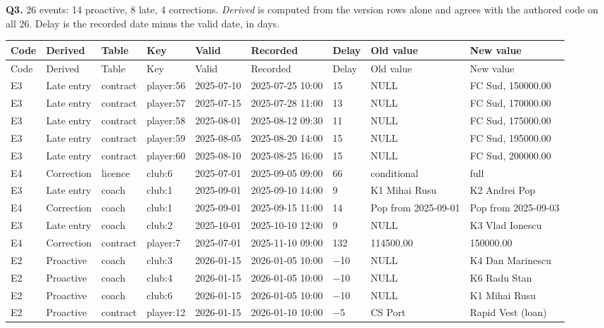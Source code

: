 \documentclass[10pt,a4paper]{article}
\begin{document}
\textbf{Q3.}  26 events: 14 proactive, 8 late, 4 corrections.  \emph{Derived} is
computed from the version rows alone and agrees with the authored code on all 26.
Delay is the recorded date minus the valid date, in days.
{\scriptsize
\setlength{\tabcolsep}{3pt}
\setlength{\LTpre}{2pt}
\setlength{\LTpost}{2pt}
\begin{longtable}{@{}lllllllll@{}}
\toprule
Code & Derived & Table & Key & Valid & Recorded & Delay & Old value & New value\\
\midrule
\endfirsthead
\toprule
Code & Derived & Table & Key & Valid & Recorded & Delay & Old value & New value\\
\midrule
\endhead
E3 & Late entry & contract & player:56 & 2025-07-10 & 2025-07-25 10:00 & 15 & NULL & FC Sud, 150000.00\\
E3 & Late entry & contract & player:57 & 2025-07-15 & 2025-07-28 11:00 & 13 & NULL & FC Sud, 170000.00\\
E3 & Late entry & contract & player:58 & 2025-08-01 & 2025-08-12 09:30 & 11 & NULL & FC Sud, 175000.00\\
E3 & Late entry & contract & player:59 & 2025-08-05 & 2025-08-20 14:00 & 15 & NULL & FC Sud, 195000.00\\
E3 & Late entry & contract & player:60 & 2025-08-10 & 2025-08-25 16:00 & 15 & NULL & FC Sud, 200000.00\\
E4 & Correction & licence & club:6 & 2025-07-01 & 2025-09-05 09:00 & 66 & conditional & full\\
E3 & Late entry & coach & club:1 & 2025-09-01 & 2025-09-10 14:00 & 9 & K1 Mihai Rusu & K2 Andrei Pop\\
E4 & Correction & coach & club:1 & 2025-09-01 & 2025-09-15 11:00 & 14 & Pop from 2025-09-01 & Pop from 2025-09-03\\
E3 & Late entry & coach & club:2 & 2025-10-01 & 2025-10-10 12:00 & 9 & NULL & K3 Vlad Ionescu\\
E4 & Correction & contract & player:7 & 2025-07-01 & 2025-11-10 09:00 & 132 & 114500.00 & 150000.00\\
E2 & Proactive & coach & club:3 & 2026-01-15 & 2026-01-05 10:00 & $-$10 & NULL & K4 Dan Marinescu\\
E2 & Proactive & coach & club:4 & 2026-01-15 & 2026-01-05 10:00 & $-$10 & NULL & K6 Radu Stan\\
E2 & Proactive & coach & club:6 & 2026-01-15 & 2026-01-05 10:00 & $-$10 & NULL & K1 Mihai Rusu\\
E2 & Proactive & contract & player:12 & 2026-01-15 & 2026-01-10 10:00 & $-$5 & CS Port & Rapid Vest (loan)\\

\end{longtable}}
\end{document}
